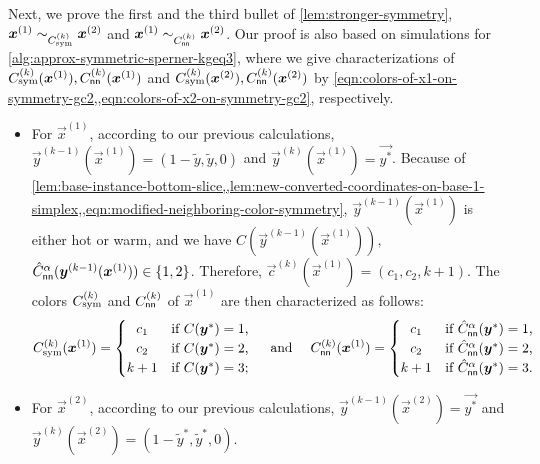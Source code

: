 Next, we prove the first and the third bullet of \cref{lem:stronger-symmetry}, $\vec{x}^{(1)} \sim_{\Csym{k}} \vec{x}^{(2)}$ and $\vec{x}^{(1)}\sim_{C^{(k)}_{\sf nn}} \vec{x}^{(2)}$.
Our proof is also based on simulations for \cref{alg:approx-symmetric-sperner-kgeq3}, where we give characterizations of $\Csym{k}(\vec{x}^{(1)}), C^{(k)}_{\sf nn}(\vec{x}^{(1)})$ and $\Csym{k}(\vec{x}^{(2)}), C^{(k)}_{\sf nn}(\vec{x}^{(2)})$ by \cref{eqn:colors-of-x1-on-symmetry-gc2,,eqn:colors-of-x2-on-symmetry-gc2}, respectively.
\begin{itemize}[itemsep=0.2em, topsep=0.5em]
    \item For $\vec{x}^{(1)}$, according to our previous calculations, $\vec{y}^{(k-1)}(\vec{x}^{(1)})=(1-\tilde{y}, \tilde{y}, 0)$ and $\vec{y}^{(k)}(\vec{x}^{(1)})=\vec{y^*}$. 
    Because of \cref{lem:base-instance-bottom-slice,,lem:new-converted-coordinates-on-base-1-simplex,,eqn:modified-neighboring-color-symmetry}, $\vec{y}^{(k-1)}(\vec{x}^{(1)})$ is either hot or warm, and we have $C(\vec{y}^{(k-1)}(\vec{x}^{(1)})),$ $\hat{C}_{\sf nn}^{\alpha}(\vec{y}^{(k-1)}(\vec{x}^{(1)})) \in \{1,2\}$. 
    Therefore, $\vec{c}^{(k)}(\vec{x}^{(1)}) = (c_1,c_2,k+1)$.
    The colors $\Csym{k}$ and $C^{(k)}_{\sf nn}$ of $\vec{x}^{(1)}$ are then characterized as follows:
    \begin{align}
        \label{eqn:colors-of-x1-on-symmetry-gc2}
        \Csym{k}(\vec{x}^{(1)}) = \begin{cases}
            \hfill c_1 \hfill  & \text{if $C(\vec{y}^*)=1$,} \\
            \hfill c_2 \hfill & \text{if $C(\vec{y}^*)=2$,} \\
            k+1 & \text{if $C(\vec{y}^*)=3$;}
        \end{cases}
        \quad
        \text{ and }
        \quad 
        C_{\sf nn}^{(k)}(\vec{x}^{(1)}) = \begin{cases}
            \hfill c_1 \hfill  & \text{if $\hat{C}^{\alpha}_{\sf nn}(\vec{y}^*)=1$,} \\
            \hfill c_2 \hfill & \text{if $\hat{C}^{\alpha}_{\sf nn}(\vec{y}^*)=2$,} \\
            k+1 & \text{if $\hat{C}^{\alpha}_{\sf nn}(\vec{y}^*)=3$.}
        \end{cases}
    \end{align}
    \item For $\vec{x}^{(2)}$, according to our previous calculations, $\vec{y}^{(k-1)}(\vec{x}^{(2)})=\vec{y^*}$ and $\vec{y}^{(k)}(\vec{x}^{(2)}) =(1-\tilde{y}^*, \tilde{y}^*, 0)$. 

\end{itemize}
